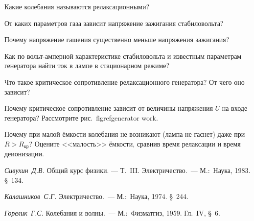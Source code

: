 \begin{lab:questions}
	\item Какие колебания называются релаксационными?

	\item От каких параметров газа зависит напряжение зажигания стабиловольта?

	\item Почему напряжение гашения существенно меньше напряжения зажигания?


	\item Как по вольт-амперной характеристике стабиловольта и известным параметрам генератора найти ток в лампе в стационарном
режиме?

	\item Что такое критическое сопротивление релаксационного генератора? От чего оно зависит?

	\item Почему критическое сопротивление зависит от величины напряжения $U$ на входе генератора? Рассмотрите рис.~figref{generator work}.

	\item Почему при малой ёмкости колебания не возникают (лампа не гаснет) даже при $R>R_{\text{кр}}$? Оцените <<малость>> ёмкости,
сравнив время релаксации и время деионизации.
\end{lab:questions}

\begin{lab:literature}

	\item \emph{Сивухин~Д.В.} Общий курс физики. --- Т.~III. Электричество.~--- М.:~Наука, 1983. \S~134.

	\item \emph{Калашников~С.Г.} Электричество.~--- М.:~Наука, 1974. \S~244.

	\item \emph{Горелик~Г.С.} Колебания и волны.~--- М.:~Физматгиз, 1959. Гл.~IV, \S~6.

\end{lab:literature}
